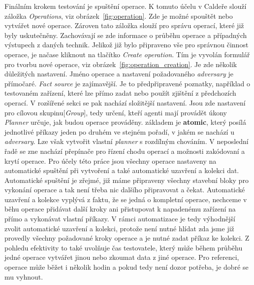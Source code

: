 Finálním krokem testování je spuštění operace.
K tomuto účelu v Caldeře slouží záložka \textit{Operations}, viz obrázek~\ref{fig:operation}.
Zde je možné spouštět nebo vytvářet nové operace.
Zároven tato záložka slouží pro správu operací, které již byly uskutečněny.
Zachovávají se zde informace o průběhu operace a případných výstupech z daných technik.
Jelikož již bylo připraveno vše pro správnou činnost operace, je načase kliknout na tlačítko \textit{Create operation}.
Tím je vyvolán formulář pro tvorbu nové operace, viz obrázek~\ref{fig:operation_creation}.
Je zde několik důležitých nastavení.
Jméno operace a nastavení požadovaného \textit{adversary} je přímočaré.
\textit{Fact source} je zajímavější.
Je to předpřipravené poznatky, například o testovaném zařízení, které lze přímo zadat nebo použít zjištění z předchozích operací.
V rozšířené sekci se pak nachází složitější nastavení.
Jsou zde nastavení pro cílovou skupinu[\textit{Group}], tedy určení, kteří agenti mají provádět úkony
\textit{Planner} určuje, jak budou operace prováděny.
základem je \textbf{atomic}, který posílá jednotlivé příkazy jeden po druhém ve stejném pořadí, v jakém se nachází u \textit{adversary}.
Lze však vytvořit vlastní \textit{planner} s rozdílným chováním\cite{mitre_caldera_docs}.
V neposlední řadě se zne nachází přepínače pro řízení chodu operací a možnosti zakódovaní a krytí operace.
Pro účely této práce jsou všechny operace nastaveny na automatické spuštění při vytvoření a také automatické uzavření a kolekci dat.
Automatické spuštění je zřejmé, již máme připraveny všechny stavební bloky pro vykonání operace a tak není třeba nic dalšího připravovat a čekat.
Automatické uzavření a kolekce vyplývá z faktu, že se jedná o kompletní operace, nechceme v běhu operace přidávat další kroky ani přistupovat k napadenému zařízení na přímo a vykonávat vlastní příkazy.
V rámci automatizace je tedy výhodnější zvolit automatické uzavření a kolekci, protože není nutné hlídat zda jsme již provedly všechny požadované kroky operace a je nutné zadat příkaz ke kolekci.
Z pohledu efektivity to také uvolňuje čas testovatele, který může během průběhu jedné operace vytvářet jinou nebo zkoumat data z jiné operace.
Pro referenci, operace může běžet i několik hodin a pokud tedy není dozor potřeba, je dobré se mu vyhnout.




